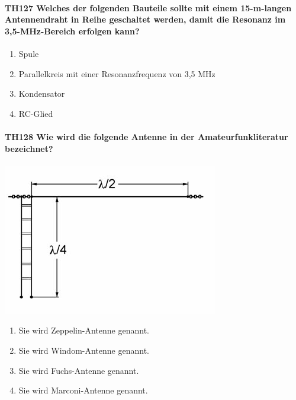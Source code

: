 \documentclass[8pt]{article}
\begin{document}
\paragraph*{TH127 Welches der folgenden Bauteile sollte mit einem 15-m-langen Antennendraht in Reihe geschaltet werden, damit die Resonanz im 3,5-MHz-Bereich erfolgen kann?}
\begin{enumerate}[nolistsep,label=\Alph*]
\item Spule
\item Parallelkreis mit einer Resonanzfrequenz von 3,5 MHz
\item Kondensator
\item RC-Glied
\end{enumerate}

\paragraph*{TH128 Wie wird die folgende Antenne in der Amateurfunkliteratur bezeichnet?}
\begin{center}
	\begin{minipage}{\linewidth}
		\centering
		\includegraphics[scale=1.0]{pics/th128_a.jpg}
	\end{minipage}
\end{center}
\begin{enumerate}[nolistsep,label=\Alph*]
\item Sie wird Zeppelin-Antenne genannt.
\item Sie wird Windom-Antenne genannt.
\item Sie wird Fuchs-Antenne genannt.
\item Sie wird Marconi-Antenne genannt.
\end{enumerate}
\end{document}
